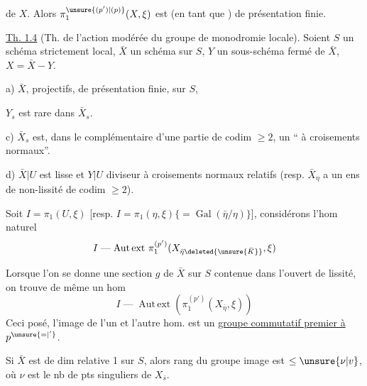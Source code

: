 de $X$. Alors $\pi_1^{\unsure{(p')|(p)}}(X,\xi)$ est (en tant que ) de présentation finie.

\uline{Th. 1.4} (Th. de l'action modérée du groupe de monodromie locale). Soient $S$ un schéma strictement local, $\bar X$ un schéma sur $S$, $Y$ un sous-schéma fermé de $\bar X$, $X=\bar X-Y$.

a) $\bar X$,   projectifs, de présentation finie,  sur $S$, 

 $Y_s$ est rare dans $\bar X_s$.

c) $\bar X_s$ est, dans le complémentaire d'une partie de codim $\geq2$, un `` à croisements normaux''.
  


d) $\bar X|U$ est lisse et $Y|U$ diviseur à croisements normaux relatifs (resp. $\bar X_\eta$ a un ens de non-lissité de codim $\geq2$).

Soit $I=\pi_1(U,\xi)$ [resp. $I=\pi_1(\eta,\xi)\{=\operatorname{Gal}(\bar\eta/\eta)\}$], considérons l'hom naturel
\[
I\mathrel{\text{---}}\operatorname{Aut\,ext}\,\pi_1^{(p')}(X_{\bar\eta\deleted{\unsure{\bar K}}},\xi)
\]

Lorsque l'on se donne une section $g$ de $\bar X$ sur $S$ contenue dans l'ouvert de lissité, on trouve de même un hom
\[
I\mathrel{\text{---}}\operatorname{Aut\,ext}(\pi_1^{(p')}(X_{\bar\eta},\xi))
\]
Ceci posé, l'image de l'un et l'autre hom. est un \uline{groupe  commutatif premier à $p^{\unsure{=|'}}$}.

Si $\bar X$ est de dim relative 1 sur $S$, alors  rang  du groupe image est $\leq\unsure{\nu|v}$, où $\nu$ est le nb de pts singuliers de $X_{\bar s}$.
